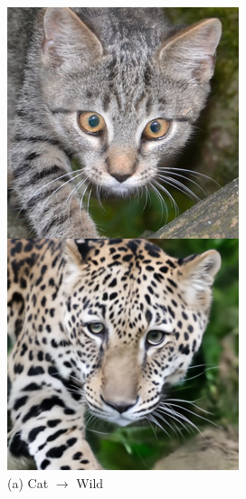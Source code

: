 \documentclass{article}
\begin{document}
\begin{figure}
\begin{minipage}[t]{0.48\textwidth}
\begin{minipage}[t]{0.19\textwidth}
            \includegraphics[width=\linewidth]{img/afhq_main/afhq256_fwd_5.png}
        \end{minipage}
        \caption*{(a) Cat $\rightarrow$ Wild} 
    \end{minipage}
    \hfill

\end{figure}
\end{document}
